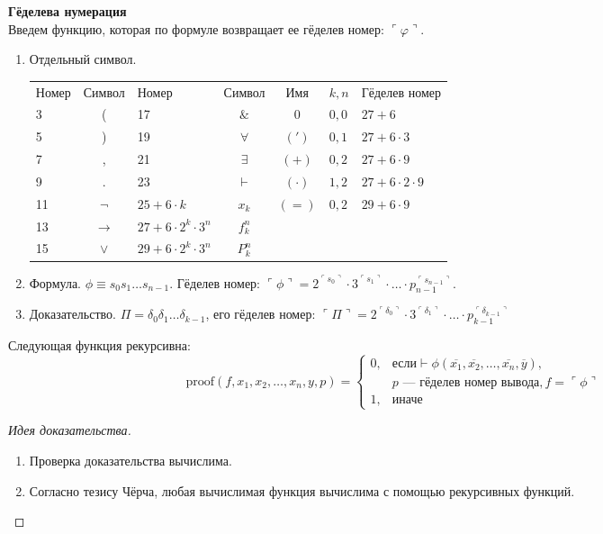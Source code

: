 \textbf{Гёделева нумерация}\\
Введем функцию, которая по формуле возвращает ее гёделев номер: $\ulcorner\varphi \urcorner$.
\begin{enumerate}
\item Отдельный символ.

\begin{tabular}{lc|lc||cll}
Номер & Символ & Номер & Символ & Имя & $k,n$ & Гёделев номер\\
3 & ( &               17 & $\&$ &  0 & $0,0$ & $27 + 6$\\
5 & ) &               19 & $\forall$ & $(')$ & $0,1$ & $27 + 6 \cdot 3$\\
7 & , &               21 & $\exists$ & $(+)$ & $0,2$ & $27 + 6 \cdot 9$\\
9 & . &               23 & $\vdash$ & $(\cdot)$ & $1,2$ & $27 + 6 \cdot 2 \cdot 9$\\
11 & $\neg$ &         $25 + 6\cdot k$ & $x_k$ & $(=)$ & $0,2$ & $29 + 6 \cdot 9$\\
13 & $\rightarrow$ &  $27 + 6\cdot 2^k \cdot 3^n$ & $f_k^n$\\
15 & $\vee$ &         $29 + 6\cdot 2^k \cdot 3^n$ & $P_k^n$
\end{tabular}

\item Формула. $\phi \equiv s_0s_1\dots s_{n-1}$. Гёделев номер: $\ulcorner\phi\urcorner = 2^{\ulcorner s_0\urcorner}\cdot 3^{\ulcorner s_1\urcorner}
\cdot \dots \cdot p_{n-1}^{\ulcorner s_{n-1}\urcorner}$.

\item Доказательство. $\Pi = \delta_0\delta_1\dots\delta_{k-1}$, его гёделев номер: $\ulcorner\Pi\urcorner =
2^{\ulcorner \delta_0\urcorner}\cdot 3^{\ulcorner \delta_1\urcorner} \cdot \dots \cdot p_{k-1}^{\ulcorner \delta_{k-1}\urcorner}$
\end{enumerate}


\begin{theorem}
    Следующая функция рекурсивна:
$$\text{proof}(f,x_1,x_2,\dots,x_n,y,p) = \left\{\begin{array}{ll}
0, & \mbox{если} \vdash\phi(\overline{x_1},\overline{x_2},\dots,\overline{x_n},\overline{y}),\\
   & p \mbox{ --- гёделев номер вывода}, f = \ulcorner\phi\urcorner \\
1, & \mbox{иначе}
\end{array}\right.$$\vspace{-0.1cm}
\end{theorem}
\begin{proof}[Идея доказательства]
\begin{enumerate}
\item Проверка доказательства вычислима.
\item Согласно тезису Чёрча, любая вычислимая функция
вычислима с помощью рекурсивных функций.
\end{enumerate}
\end{proof}

